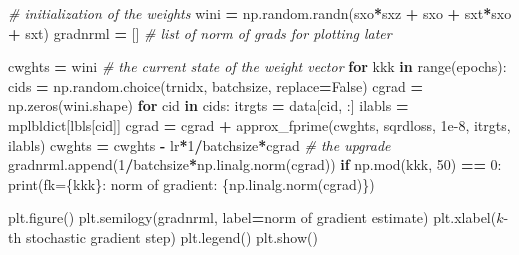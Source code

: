 \documentclass[
]{book}
\newenvironment{Shaded}{\begin{snugshade}}{\end{snugshade}}
\newcommand{\BuiltInTok}[1]{#1}
\newcommand{\CommentTok}[1]{\textcolor[rgb]{0.56,0.35,0.01}{\textit{#1}}}
\newcommand{\ControlFlowTok}[1]{\textcolor[rgb]{0.13,0.29,0.53}{\textbf{#1}}}
\newcommand{\DecValTok}[1]{\textcolor[rgb]{0.00,0.00,0.81}{#1}}
\newcommand{\FloatTok}[1]{\textcolor[rgb]{0.00,0.00,0.81}{#1}}
\newcommand{\KeywordTok}[1]{\textcolor[rgb]{0.13,0.29,0.53}{\textbf{#1}}}
\newcommand{\NormalTok}[1]{#1}
\newcommand{\OperatorTok}[1]{\textcolor[rgb]{0.81,0.36,0.00}{\textbf{#1}}}
\newcommand{\SpecialCharTok}[1]{\textcolor[rgb]{0.00,0.00,0.00}{#1}}
\newcommand{\SpecialStringTok}[1]{\textcolor[rgb]{0.31,0.60,0.02}{#1}}
\newcommand{\StringTok}[1]{\textcolor[rgb]{0.31,0.60,0.02}{#1}}
\newcommand{\VariableTok}[1]{\textcolor[rgb]{0.00,0.00,0.00}{#1}}
\theoremstyle{definition}
\theoremstyle{definition}
\theoremstyle{definition}
\theoremstyle{definition}
\theoremstyle{remark}
\begin{document}
\begin{Shaded}
\begin{Highlighting}[]
\CommentTok{\# initialization of the weights}
\NormalTok{wini }\OperatorTok{=}\NormalTok{ np.random.randn(sxo}\OperatorTok{*}\NormalTok{sxz }\OperatorTok{+}\NormalTok{ sxo }\OperatorTok{+}\NormalTok{ sxt}\OperatorTok{*}\NormalTok{sxo }\OperatorTok{+}\NormalTok{ sxt)}
\NormalTok{gradnrml }\OperatorTok{=}\NormalTok{ []  }\CommentTok{\# list of norm of grads for plotting later}

\NormalTok{cwghts }\OperatorTok{=}\NormalTok{ wini  }\CommentTok{\# the current state of the weight vector}
\ControlFlowTok{for}\NormalTok{ kkk }\KeywordTok{in} \BuiltInTok{range}\NormalTok{(epochs):}
\NormalTok{    cids }\OperatorTok{=}\NormalTok{ np.random.choice(trnidx, batchsize, replace}\OperatorTok{=}\VariableTok{False}\NormalTok{)}
\NormalTok{    cgrad }\OperatorTok{=}\NormalTok{ np.zeros(wini.shape)}
    \ControlFlowTok{for}\NormalTok{ cid }\KeywordTok{in}\NormalTok{ cids:}
\NormalTok{        itrgts }\OperatorTok{=}\NormalTok{ data[cid, :]}
\NormalTok{        ilabls }\OperatorTok{=}\NormalTok{ mplbldict[lbls[cid]]}
\NormalTok{        cgrad }\OperatorTok{=}\NormalTok{ cgrad }\OperatorTok{+}\NormalTok{ approx\_fprime(cwghts, sqrdloss, }\FloatTok{1e{-}8}\NormalTok{,}
\NormalTok{                                      itrgts, ilabls)}
\NormalTok{    cwghts }\OperatorTok{=}\NormalTok{ cwghts }\OperatorTok{{-}}\NormalTok{ lr}\OperatorTok{*}\DecValTok{1}\OperatorTok{/}\NormalTok{batchsize}\OperatorTok{*}\NormalTok{cgrad  }\CommentTok{\# the upgrade}
\NormalTok{    gradnrml.append(}\DecValTok{1}\OperatorTok{/}\NormalTok{batchsize}\OperatorTok{*}\NormalTok{np.linalg.norm(cgrad))}
    \ControlFlowTok{if}\NormalTok{ np.mod(kkk, }\DecValTok{50}\NormalTok{) }\OperatorTok{==} \DecValTok{0}\NormalTok{:}
        \BuiltInTok{print}\NormalTok{(}\SpecialStringTok{f\textquotesingle{}k=}\SpecialCharTok{\{}\NormalTok{kkk}\SpecialCharTok{\}}\SpecialStringTok{: norm of gradient: }\SpecialCharTok{\{np.}\NormalTok{linalg}\SpecialCharTok{.}\NormalTok{norm(cgrad)}\SpecialCharTok{\}}\SpecialStringTok{\textquotesingle{}}\NormalTok{)}
\end{Highlighting}
\end{Shaded}

\begin{Shaded}
\begin{Highlighting}[]
\NormalTok{plt.figure()}
\NormalTok{plt.semilogy(gradnrml, label}\OperatorTok{=}\StringTok{\textquotesingle{}norm of gradient estimate\textquotesingle{}}\NormalTok{)}
\NormalTok{plt.xlabel(}\StringTok{\textquotesingle{}$k${-}th stochastic gradient step\textquotesingle{}}\NormalTok{)}
\NormalTok{plt.legend()}
\NormalTok{plt.show()}
\end{Highlighting}
\end{Shaded}
\end{document}
